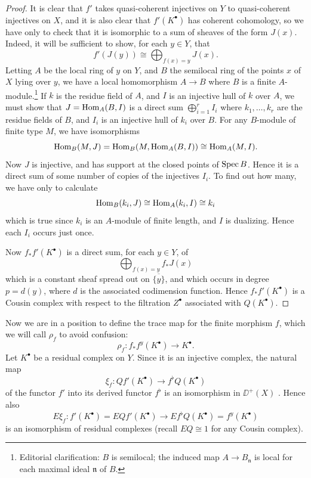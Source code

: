 \begin{proof}
It is clear that $f'$ takes quasi-coherent injectives on $Y$ to quasi-coherent injectives on $X$, and it is also clear that $f'(K^\bullet)$ has coherent cohomology, so we have only to check that it is isomorphic to a sum of sheaves of the form $J(x)$. Indeed, it will be sufficient to show, for each $y\in Y$, that
\[
f'(J(y)) \cong \bigoplus_{f(x)=y} J(x).
\]
Letting $A$ be the local ring of $y$ on $Y$, and $B$ the semilocal ring of the points $x$ of $X$ lying over $y$, we have a local homomorphism $A\to B$ where $B$ is a finite $A$-module.\footnote{Editorial clarification: $B$ is semilocal; the induced map $A\to B_{\mathfrak n}$ is local for each maximal ideal $\mathfrak n$ of $B$.} If $k$ is the residue field of $A$, and $I$ is an injective hull of $k$ over $A$, we must show that $J = \operatorname{Hom}_A(B,I)$ is a direct sum $\bigoplus_{i=1}^{r} I_i$ where $k_1,\dots,k_r$ are the residue fields of $B$, and $I_i$ is an injective hull of $k_i$ over $B$. For any $B$-module of finite type $M$, we have isomorphisms
\[
\operatorname{Hom}_{B}(M,J) = \operatorname{Hom}_{B}(M, \operatorname{Hom}_{A}(B,I)) \cong \operatorname{Hom}_{A}(M,I).
\]
Now $J$ is injective, and has support at the closed points of $\operatorname{Spec} B$. Hence it is a direct sum of some number of copies of the injectives $I_i$. To find out how many, we have only to calculate
\[
\operatorname{Hom}_{B}(k_i,J) \cong \operatorname{Hom}_{A}(k_i,I) \cong k_i
\]
which is true since $k_i$ is an $A$-module of finite length, and $I$ is dualizing. Hence each $I_i$ occurs just once.

Now $f_*f'(K^\bullet)$ is a direct sum, for each $y\in Y$, of
\[
\bigoplus_{f(x)=y} f_* J(x)
\]
which is a constant sheaf spread out on $\overline{\{y\}}$, and which occurs in degree $p = d(y)$, where $d$ is the associated codimension function. Hence $f_*f'(K^\bullet)$ is a Cousin complex with respect to the filtration $Z^\bullet$ associated with $Q(K^\bullet)$.

\end{proof}

\begingroup
\setlength{\emergencystretch}{2em}
Now we are in a position to define the trace map for the finite morphism $f$, which we will call $\rho_f$ to avoid confusion:
\[
\rho_{f}\colon f_{*}f^{y}(K^{\bullet}) \longrightarrow K^{\bullet}.
\]
Let $K^\bullet$ be a residual complex on $Y$. Since it is an injective complex, the natural map
\[
\xi_{f}\colon Qf'(K^\bullet) \longrightarrow f^{\flat}Q(K^\bullet)
\]
of the functor $f'$ into its derived functor $f^{\flat}$ is an isomorphism in $\DD^{+}(X)$ . Hence also
\[
E\xi_{f}\colon f'(K^\bullet) = EQf'(K^\bullet) \longrightarrow Ef^{\flat}Q(K^\bullet) = f^{y}(K^\bullet)
\]
is an isomorphism of residual complexes (recall $EQ \cong 1$ for any Cousin complex).

